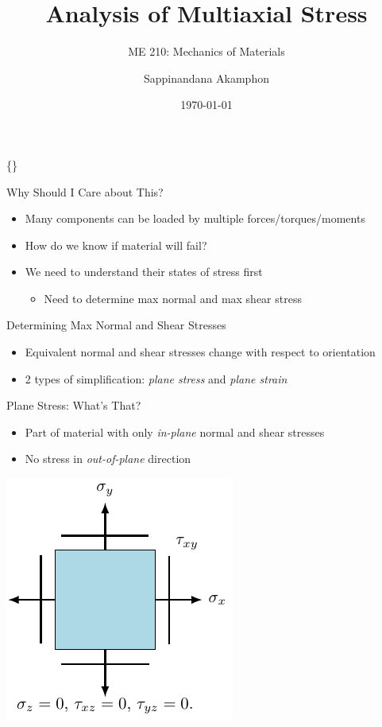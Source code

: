 \documentclass[10pt, svgnames]{beamer}
\author{Sappinandana Akamphon}
\date{\today}
\title{Analysis of Multiaxial Stress}
\subtitle{ME 210: Mechanics of Materials}
\institute{Department of Mechanical Engineering, TSE}
\date{}
\begin{document}
\begin{frame}[label={sec:orgcae5953}]{\{\}}
\maketitle
\end{frame}

\begin{frame}[label={sec:org18a9a5f}]{Why Should I Care about This?}
\begin{itemize}
\item Many components can be loaded by multiple forces/torques/moments
\item How do we know if material will fail?
\item We need to understand their states of stress first
\begin{itemize}
\item Need to determine max normal and max shear stress
\end{itemize}
\end{itemize}
\end{frame}

\begin{frame}[label={sec:orgb60f210}]{Determining Max Normal and Shear Stresses}
\begin{itemize}
\item Equivalent normal and shear stresses change with respect to
orientation
\item 2 types of simplification: \emph{plane stress} and \emph{plane strain}
\end{itemize}
\end{frame}

\begin{frame}[label={sec:orge40164e}]{Plane Stress: What's That?}
\begin{itemize}
\item Part of material with only \emph{in-plane} normal and shear stresses

\item No stress in \emph{out-of-plane} direction
\end{itemize}

\begin{center}
\includegraphics[height=0.7\textheight]{pictures/plane-stress.pdf}
\end{center}
\end{frame}
\end{document}
